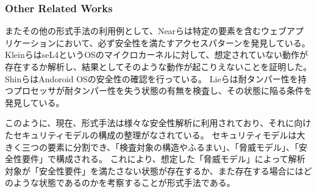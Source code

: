 \documentclass[journal]{IEEEtran}
\begin{document}
\subsubsection{Other Related Works}
またその他の形式手法の利用例として、Nearら\cite{finding_security_bugs_in_web}は特定の要素を含むウェブアプリケーションにおいて、必ず安全性を満たすアクセスパターンを発見している。
Kleinら\cite{sel4_formal_verification_of_an}はseL4というOSのマイクロカーネルに対して、想定されていない動作が存在するか解析し、結果としてそのような動作が起こりえないことを証明した。
Shinら\cite{towards_formal_analysis_of_the}はAndoroid OSの安全性の確認を行っている。
Lieら\cite{specifying_and_verifying_hardware_for_tamper}は耐タンパー性を持つプロセッサが耐タンパー性を失う状態の有無を検査し、その状態に陥る条件を発見している。

このように、現在、形式手法は様々な安全性解析に利用されており、それに向けたセキュリティモデルの構成の整理がなされている\cite{security_modeling_and_analysis}。
セキュリティモデルは大きく三つの要素に分割でき、「検査対象の構造やふるまい」、「脅威モデル」、「安全性要件」で構成される。
これにより、想定した「脅威モデル」によって解析対象が「安全性要件」を満たさない状態が存在するか、また存在する場合にはどのような状態であるのかを考察することが形式手法である。
\end{document}
